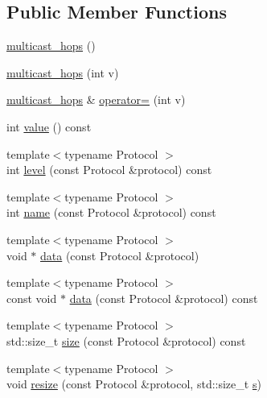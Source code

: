 \subsection*{Public Member Functions}
\begin{DoxyCompactItemize}
\item 
\hyperlink{classasio_1_1ip_1_1detail_1_1socket__option_1_1multicast__hops_a40d0730336d716f104f0ab4c5a17006c}{multicast\+\_\+hops} ()
\item 
\hyperlink{classasio_1_1ip_1_1detail_1_1socket__option_1_1multicast__hops_afa4134179618462304bd76bd9eaf1c98}{multicast\+\_\+hops} (int v)
\item 
\hyperlink{classasio_1_1ip_1_1detail_1_1socket__option_1_1multicast__hops}{multicast\+\_\+hops} \& \hyperlink{classasio_1_1ip_1_1detail_1_1socket__option_1_1multicast__hops_a3fa2af3243a1cb77d915773a3c408451}{operator=} (int v)
\item 
int \hyperlink{classasio_1_1ip_1_1detail_1_1socket__option_1_1multicast__hops_ac0972bf715ce8bb51d40785a07ffb165}{value} () const 
\item 
{\footnotesize template$<$typename Protocol $>$ }\\int \hyperlink{classasio_1_1ip_1_1detail_1_1socket__option_1_1multicast__hops_a7d3c32f3a25e951b095a6978dc1c2e7d}{level} (const Protocol \&protocol) const 
\item 
{\footnotesize template$<$typename Protocol $>$ }\\int \hyperlink{classasio_1_1ip_1_1detail_1_1socket__option_1_1multicast__hops_a6aa3b7f43673cc5541218a985d05ef00}{name} (const Protocol \&protocol) const 
\item 
{\footnotesize template$<$typename Protocol $>$ }\\void $\ast$ \hyperlink{classasio_1_1ip_1_1detail_1_1socket__option_1_1multicast__hops_a89b8415672c64da875e137256dbaf0b0}{data} (const Protocol \&protocol)
\item 
{\footnotesize template$<$typename Protocol $>$ }\\const void $\ast$ \hyperlink{classasio_1_1ip_1_1detail_1_1socket__option_1_1multicast__hops_acbd870f2f9bacb87a1b7dccf5e5e7471}{data} (const Protocol \&protocol) const 
\item 
{\footnotesize template$<$typename Protocol $>$ }\\std\+::size\+\_\+t \hyperlink{classasio_1_1ip_1_1detail_1_1socket__option_1_1multicast__hops_a950d46c13f7d4133b09388c985d6bf63}{size} (const Protocol \&protocol) const 
\item 
{\footnotesize template$<$typename Protocol $>$ }\\void \hyperlink{classasio_1_1ip_1_1detail_1_1socket__option_1_1multicast__hops_a5e2469dc162752dee96ccf148496cb0e}{resize} (const Protocol \&protocol, std\+::size\+\_\+t \hyperlink{group__async__connect_ga31ab74b9ea6c77932dddd016cfc7920a}{s})
\end{DoxyCompactItemize}


